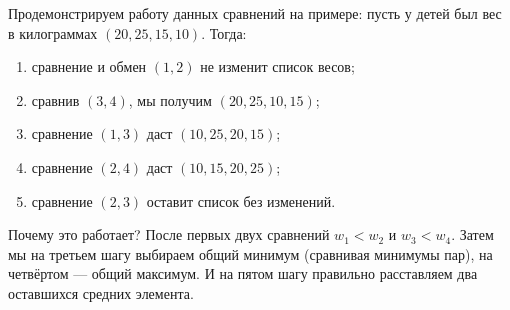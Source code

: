 \begin{itemize}
Продемонстрируем работу данных сравнений на примере: пусть у детей был вес в килограммах
$(20,25,15,10)$. Тогда:
\begin{enumerate}
\item сравнение и обмен $(1,2)$ не изменит список весов;
\item сравнив $(3,4)$, мы получим $(20,25,10,15)$;
\item сравнение $(1,3)$ даст $(10,25,20,15)$;
\item сравнение $(2,4)$ даст $(10,15,20,25)$;
\item сравнение $(2,3)$ оставит список без изменений.
\end{enumerate}

Почему это работает? После первых двух сравнений $w_1 < w_2$
и $w_3 < w_4$. Затем мы на третьем шагу выбираем общий минимум 
(сравнивая минимумы пар), на четвёртом --- общий максимум. 
И на пятом шагу правильно расставляем два оставшихся средних элемента.

\end{itemize}
